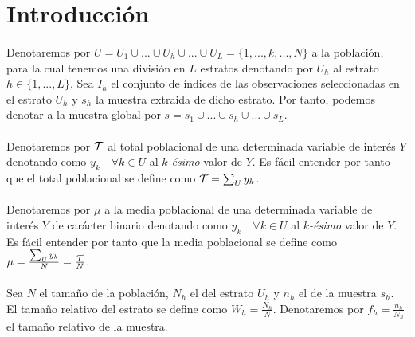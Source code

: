 \documentclass{article}
\begin{document}
  \maketitle



  \section{Introducción}

    \paragraph{}
    Denotaremos por $U = U_1 \cup ... \cup U_h \cup... \cup U_L = \{1, ...,k,...,N\} $ a la población, para la cual tenemos una división en $L$ estratos denotando por $U_h$ al estrato $h \in \{1,..., L\}$. Sea $I_h$ el conjunto de índices de las observaciones seleccionadas en el estrato $U_h$ y $s_h$ la muestra extraida de dicho estrato. Por tanto, podemos denotar a la muestra global por $s = s_1 \cup ... \cup s_h \cup ... \cup s_L$.

    \paragraph{}
    Denotaremos por $\mathcal{T}$ al total poblacional de una determinada variable de interés $Y$ denotando como $y_k \quad \forall k \in U$ al \emph{$k$-ésimo} valor de $Y$. Es fácil entender por tanto que el total poblacional se define como $\mathcal{T} = \sum_U y_k$.

    \paragraph{}
    Denotaremos por $\mu$ a la media poblacional de una determinada variable de interés $Y$ de carácter binario denotando como $y_k \quad \forall k \in U$ al \emph{$k$-ésimo} valor de $Y$. Es fácil entender por tanto que la media poblacional se define como $\mu = \frac{\sum_U y_k}{N} = \frac{\mathcal{T}}{N}$.

    \paragraph{}
    Sea $N$ el tamaño de la población, $N_h$ el del estrato $U_h$ y $n_h$ el de la muestra $s_h$. El tamaño relativo del estrato se define como $W_h = \frac{N_h}{N}$. Denotaremos por $f_h = \frac{n_h}{N_h}$ el tamaño relativo de la muestra.
\end{document}
